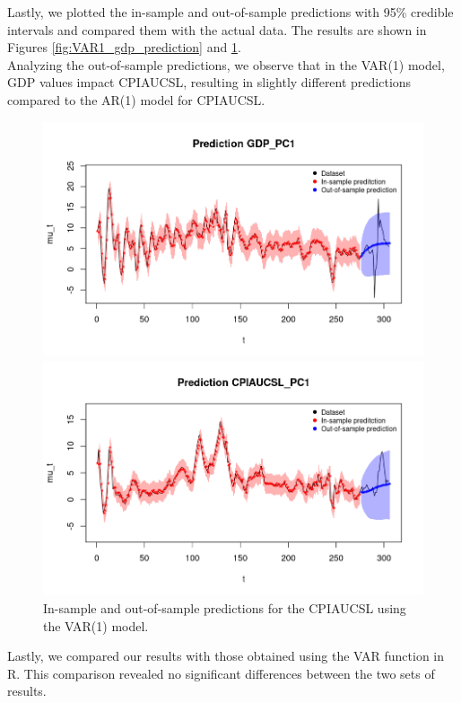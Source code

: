 Lastly, we plotted the in-sample and out-of-sample predictions with 95\% credible intervals and compared them with the actual data. The results are shown in Figures \ref{fig:VAR1_gdp_prediction} and \ref{fig:VAR1_infl_prediction}. \\ 
Analyzing the out-of-sample predictions, we observe that in the VAR(1) model, GDP values impact CPIAUCSL, resulting in slightly different predictions compared to the AR(1) model for CPIAUCSL.
\begin{figure}[H]
    \centering
    \begin{minipage}{0.5\textwidth}
        \centering
        \includegraphics[width=\textwidth]{images/6-VAR/gdp_prediction.png}
        \caption{In-sample and out-of-sample predictions for the GDP using the VAR(1) model.}
        \label{fig:VAR1_gdp_prediction} 
    \end{minipage}\hfill
    \begin{minipage}{0.5\textwidth}
        \centering
        \includegraphics[width=\textwidth]{images/6-VAR/infl_prediction.png}
        \caption{In-sample and out-of-sample predictions for the CPIAUCSL using the VAR(1) model.}
        \label{fig:VAR1_infl_prediction}
    \end{minipage}
\end{figure}
Lastly, we compared our results with those obtained using the VAR function in R. This comparison revealed no significant differences between the two sets of results.